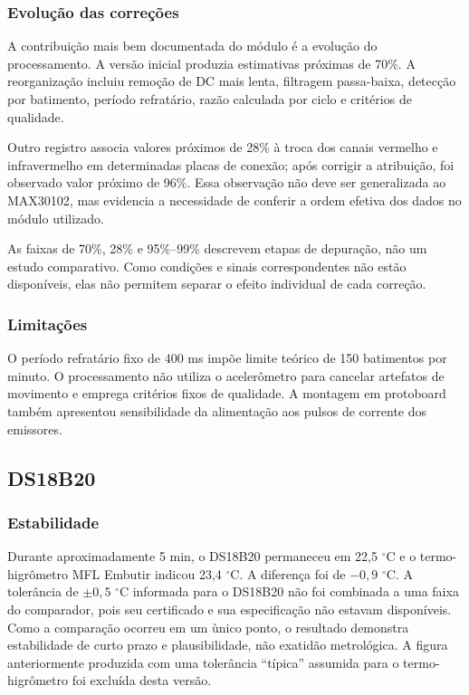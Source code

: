 \documentclass[a4paper,12pt]{article}
\begin{document}
\subsubsection{Evolu\c{c}\~ao das corre\c{c}\~oes}


A contribui\c{c}\~ao mais bem documentada do m\'odulo \'e a evolu\c{c}\~ao do processamento. A vers\~ao inicial produzia estimativas pr\'oximas de 70\%. A reorganiza\c{c}\~ao incluiu remo\c{c}\~ao de DC mais lenta, filtragem passa-baixa, detec\c{c}\~ao por batimento, per\'iodo refrat\'ario, raz\~ao calculada por ciclo e crit\'erios de qualidade.


Outro registro associa valores pr\'oximos de 28\% \`a troca dos canais vermelho e infravermelho em determinadas placas de conex\~ao; ap\'os corrigir a atribui\c{c}\~ao, foi observado valor pr\'oximo de 96\%. Essa observa\c{c}\~ao n\~ao deve ser generalizada ao MAX30102, mas evidencia a necessidade de conferir a ordem efetiva dos dados no m\'odulo utilizado.


As faixas de 70\%, 28\% e 95\%--99\% descrevem etapas de depura\c{c}\~ao, n\~ao um estudo comparativo. Como condi\c{c}\~oes e sinais correspondentes n\~ao est\~ao dispon\'iveis, elas n\~ao permitem separar o efeito individual de cada corre\c{c}\~ao.


\subsubsection{Limita\c{c}\~oes}


O per\'iodo refrat\'ario fixo de 400 ms imp\~oe limite te\'orico de 150 batimentos por minuto. O processamento n\~ao utiliza o aceler\^ometro para cancelar artefatos de movimento e emprega crit\'erios fixos de qualidade. A montagem em protoboard tamb\'em apresentou sensibilidade da alimenta\c{c}\~ao aos pulsos de corrente dos emissores.


\subsection{DS18B20}


\subsubsection{Estabilidade}

Durante aproximadamente 5 min, o DS18B20 permaneceu em 22,5 $^\circ$C e o termo-higr\^ometro MFL Embutir indicou 23,4 $^\circ$C. A diferen\c{c}a foi de $-0,9$ $^\circ$C. A toler\^ancia de $\pm0,5$ $^\circ$C informada para o DS18B20 n\~ao foi combinada a uma faixa do comparador, pois seu certificado e sua especifica\c{c}\~ao n\~ao estavam dispon\'iveis. Como a compara\c{c}\~ao ocorreu em um \`unico ponto, o resultado demonstra estabilidade de curto prazo e plausibilidade, n\~ao exatid\~ao metrol\'ogica. A figura anteriormente produzida com uma toler\^ancia ``t\'ipica'' assumida para o termo-higr\^ometro foi exclu\'ida desta vers\~ao.
\end{document}
